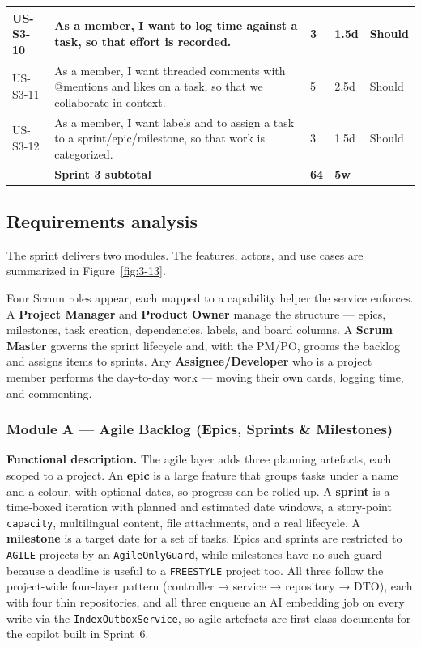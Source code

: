 \begin{longtable}{@{}l>{\raggedright\arraybackslash}p{}lll@{}}
\midrule
US-S3-10 & As a member, I want to log time against a task, so that effort is recorded. & 3 & 1.5d & Should \\
\midrule
US-S3-11 & As a member, I want threaded comments with @mentions and likes on a task, so that we collaborate in context. & 5 & 2.5d & Should \\
\midrule
US-S3-12 & As a member, I want labels and to assign a task to a sprint/epic/milestone, so that work is categorized. & 3 & 1.5d & Should \\
\midrule
 & \textbf{Sprint 3 subtotal} & \textbf{64} & \textbf{5w} & \\
\end{longtable}

\subsection{Requirements analysis}

The sprint delivers two modules. The features, actors, and use cases are summarized in
Figure~\ref{fig:3-13}.

{\renewcommand{\figmaxheight}{0.75\textheight}%
}

Four Scrum roles appear, each mapped to a capability helper the service enforces. A
\textbf{Project Manager} and \textbf{Product Owner} manage the structure --- epics, milestones,
task creation, dependencies, labels, and board columns. A \textbf{Scrum Master} governs the sprint
lifecycle and, with the PM/PO, grooms the backlog and assigns items to sprints. Any
\textbf{Assignee/Developer} who is a project member performs the day-to-day work --- moving their
own cards, logging time, and commenting.

\subsubsection{Module A --- Agile Backlog (Epics, Sprints \& Milestones)}

\textbf{Functional description.} The agile layer adds three planning artefacts, each scoped to a
project. An \textbf{epic} is a large feature that groups tasks under a name and a colour, with
optional dates, so progress can be rolled up. A \textbf{sprint} is a time-boxed iteration with
planned and estimated date windows, a story-point \texttt{capacity}, multilingual content, file
attachments, and a real lifecycle. A \textbf{milestone} is a target date for a set of tasks.
Epics and sprints are restricted to \texttt{AGILE} projects by an \texttt{AgileOnlyGuard}, while
milestones have no such guard because a deadline is useful to a \texttt{FREESTYLE} project too.
All three follow the project-wide four-layer pattern (controller → service → repository → DTO),
each with four thin repositories, and all three enqueue an AI embedding job on every write via
the \texttt{IndexOutboxService}, so agile artefacts are first-class documents for the copilot
built in Sprint~6.

